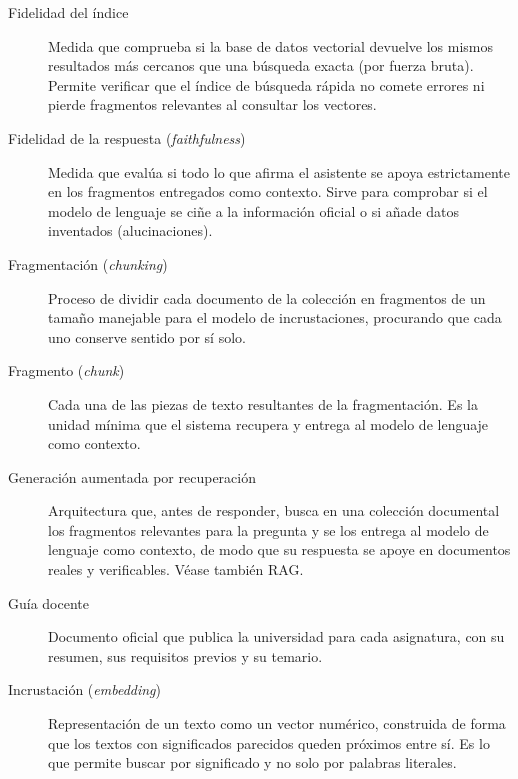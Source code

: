 \begin{description}
  \item[Fidelidad del índice] Medida que comprueba si 
        la base de datos vectorial devuelve los mismos resultados más cercanos que una 
        búsqueda exacta (por fuerza bruta). Permite verificar que el índice de búsqueda 
        rápida no comete errores ni pierde fragmentos relevantes al consultar los vectores.


   \item[Fidelidad de la respuesta (\textit{faithfulness})] Medida que evalúa 
        si todo lo que afirma el asistente se apoya estrictamente en los fragmentos entregados 
        como contexto. Sirve para comprobar si el modelo de lenguaje se ciñe a la información 
        oficial o si añade datos inventados (alucinaciones).


  \item[Fragmentación (\textit{chunking})] Proceso de dividir cada documento
        de la colección en fragmentos de un tamaño manejable para el modelo de
        incrustaciones, procurando que cada uno conserve sentido por sí solo.
        
  \item[Fragmento (\textit{chunk})] Cada una de las piezas de texto
        resultantes de la fragmentación. Es la unidad mínima que el sistema
        recupera y entrega al modelo de lenguaje como contexto.

  \item[Generación aumentada por recuperación] Arquitectura que, antes
        de responder, busca en una colección documental los fragmentos relevantes
        para la pregunta y se los entrega al modelo de lenguaje como contexto, de
        modo que su respuesta se apoye en documentos reales y verificables. Véase
        también RAG.

  \item[Guía docente] Documento oficial que publica la universidad para cada
        asignatura, con su resumen, sus requisitos previos y su temario.
        
  \item[Incrustación (\textit{embedding})] Representación de un texto como un
        vector numérico, construida de forma que los textos con significados
        parecidos queden próximos entre sí. Es lo que permite buscar por
        significado y no solo por palabras literales.
        

\end{description}

